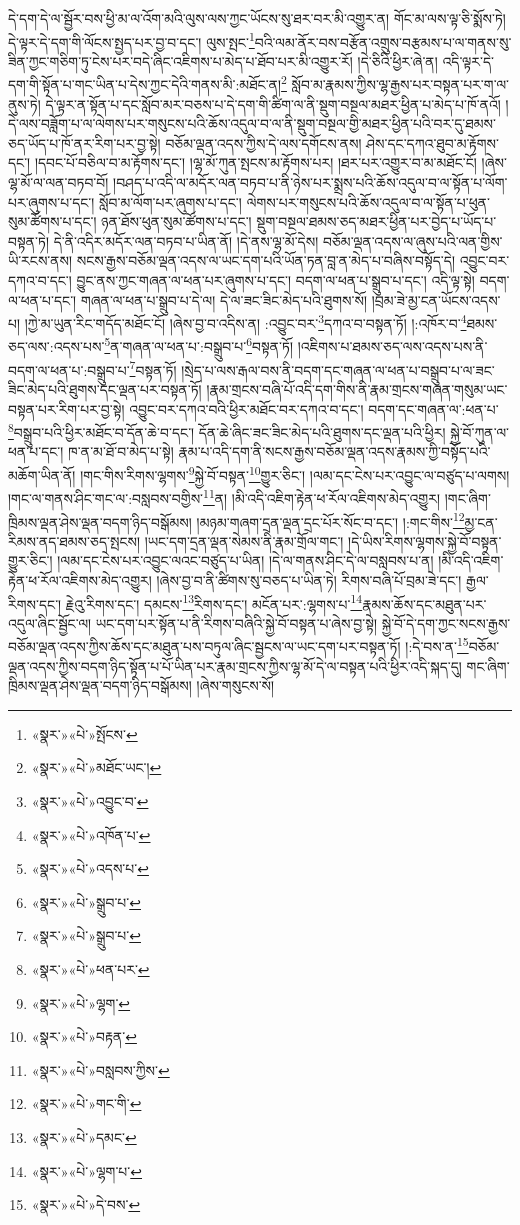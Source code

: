 དེ་དག་དེ་ལ་སྦྱོར་བས་ཕྱི་མ་ལ་འོག་མའི་ལུས་ལས་ཀྱང་ཡོངས་སུ་ཐར་བར་མི་འགྱུར་ན། གོང་མ་ལས་ལྟ་ཅི་སྨོས་ཏེ། དེ་ལྟར་དེ་དག་གི་ལོངས་སྤྱད་པར་བྱ་བ་དང་། ལུས་སྤང་\footnote{«སྣར་»«པེ་»སྤོངས་}བའི་ལམ་ནོར་བས་བརྩོན་འགྲུས་བརྩམས་པ་ལ་གནས་སུ་ཟིན་ཀྱང་གཅིག་ཏུ་ངེས་པར་བདེ་ཞིང་འཇིགས་པ་མེད་པ་ཐོབ་པར་མི་འགྱུར་རོ། །དེ་ཅིའི་ཕྱིར་ཞེ་ན། འདི་ལྟར་དེ་དག་གི་སྟོན་པ་གང་ཡིན་པ་དེས་ཀྱང་དེའི་གནས་མི་:མཐོང་ན།\footnote{«སྣར་»«པེ་»མཐོང་ཡང་།} སློབ་མ་རྣམས་ཀྱིས་ལྷ་རྒྱས་པར་བསྟན་པར་ག་ལ་ནུས་ཏེ། དེ་ལྟར་ན་སྟོན་པ་དང་སློབ་མར་བཅས་པ་དེ་དག་གི་ཚིག་ལ་ནི་སྡུག་བསྔལ་མཐར་ཕྱིན་པ་མེད་པ་ཁོ་ནའོ། །དེ་ལས་བཟློག་པ་ལ་ལེགས་པར་གསུངས་པའི་ཆོས་འདུལ་བ་ལ་ནི་སྡུག་བསྔལ་གྱི་མཐར་ཕྱིན་པའི་བར་དུ་ཐམས་ཅད་ཡོད་པ་ཁོ་ནར་རིག་པར་བྱ་སྟེ། བཅོམ་ལྡན་འདས་ཀྱིས་དེ་ལས་དགོངས་ནས། ཤེས་དང་དཀའ་ཐུབ་མ་རྟོགས་དང་། །དབང་པོ་བཅིལ་བ་མ་རྟོགས་དང་། །ལྷ་མོ་ཀུན་སྤངས་མ་རྟོགས་པར། །ཐར་པར་འགྱུར་བ་མ་མཐོང་ངོ། །ཞེས་ལྷ་མོ་ལ་ལན་བཏབ་བོ། །བཤད་པ་འདི་ལ་མདོར་ལན་བཏབ་པ་ནི་ཉེས་པར་སྨྲས་པའི་ཆོས་འདུལ་བ་ལ་སྟོན་པ་ལོག་པར་ཞུགས་པ་དང་། སློབ་མ་ལོག་པར་ཞུགས་པ་དང་། ལེགས་པར་གསུངས་པའི་ཆོས་འདུལ་བ་ལ་སྟོན་པ་ཕུན་སུམ་ཚོགས་པ་དང་། ཉན་ཐོས་ཕུན་སུམ་ཚོགས་པ་དང་། སྡུག་བསྔལ་ཐམས་ཅད་མཐར་ཕྱིན་པར་བྱེད་པ་ཡོད་པ་བསྟན་ཏེ། དེ་ནི་འདིར་མདོར་ལན་བཏབ་པ་ཡིན་ནོ། །དེ་ནས་ལྷ་མོ་དེས། བཅོམ་ལྡན་འདས་ལ་ཞུས་པའི་ལན་གྱིས་ཡི་རངས་ནས། སངས་རྒྱས་བཅོམ་ལྡན་འདས་ལ་ཡང་དག་པའི་ཡོན་ཏན་བླ་ན་མེད་པ་བཞིས་བསྟོད་དེ། འབྱུང་བར་དཀའ་བ་དང་། བྱུང་ནས་ཀྱང་གཞན་ལ་ཕན་པར་ཞུགས་པ་དང་། བདག་ལ་ཕན་པ་སྒྲུབ་པ་དང་། འདི་ལྟ་སྟེ། བདག་ལ་ཕན་པ་དང་། གཞན་ལ་ཕན་པ་སྒྲུབ་པ་དེ་ལ། དེ་ལ་ཟང་ཟིང་མེད་པའི་ཐུགས་སོ། །བྲམ་ཟེ་མྱ་ངན་ཡོངས་འདས་པ། །ཀྱེ་མ་ཡུན་རིང་གདོད་མཐོང་ངོ། །ཞེས་བྱ་བ་འདིས་ན། :འབྱུང་བར་\footnote{«སྣར་»«པེ་»འབྱུང་བ་}དཀའ་བ་བསྟན་ཏོ། །:འཁོར་བ་\footnote{«སྣར་»«པེ་»འཁོན་པ་}ཐམས་ཅད་ལས་:འདས་པས་\footnote{«སྣར་»«པེ་»འདས་པ་}ན་གཞན་ལ་ཕན་པ་:བསྒྲུབ་པ་\footnote{«སྣར་»«པེ་»སྒྲུབ་པ་}བསྟན་ཏོ། །འཇིགས་པ་ཐམས་ཅད་ལས་འདས་པས་ནི་བདག་ལ་ཕན་པ་:བསྒྲུབ་པ་\footnote{«སྣར་»«པེ་»སྒྲུབ་པ་}བསྟན་ཏོ། །སྲེད་པ་ལས་རྒལ་བས་ནི་བདག་དང་གཞན་ལ་ཕན་པ་བསྒྲུབ་པ་ལ་ཟང་ཟིང་མེད་པའི་ཐུགས་དང་ལྡན་པར་བསྟན་ཏོ། །རྣམ་གྲངས་བཞི་པོ་འདི་དག་གིས་ནི་རྣམ་གྲངས་གཞན་གསུམ་ཡང་བསྟན་པར་རིག་པར་བྱ་སྟེ། འབྱུང་བར་དཀའ་བའི་ཕྱིར་མཐོང་བར་དཀའ་བ་དང་། བདག་དང་གཞན་ལ་:ཕན་པ་\footnote{«སྣར་»«པེ་»ཕན་པར་}བསྒྲུབ་པའི་ཕྱིར་མཐོང་བ་དོན་ཆེ་བ་དང་། དོན་ཆེ་ཞིང་ཟང་ཟིང་མེད་པའི་ཐུགས་དང་ལྡན་པའི་ཕྱིར། སྐྱེ་བོ་ཀུན་ལ་ཕན་པ་དང་། ཁ་ན་མ་ཐོ་བ་མེད་པ་སྟེ། རྣམ་པ་འདི་དག་ནི་སངས་རྒྱས་བཅོམ་ལྡན་འདས་རྣམས་ཀྱི་བསྟོད་པའི་མཆོག་ཡིན་ནོ། །གང་གིས་རིགས་ལྷགས་\footnote{«སྣར་»«པེ་»ལྷག་}སྐྱེ་བོ་བསྟན་\footnote{«སྣར་»«པེ་»བརྟན་}གྱུར་ཅིང་། །ལམ་དང་ངེས་པར་འབྱུང་ལ་བཙུད་པ་ལགས། །གང་ལ་གནས་ཤིང་གང་ལ་:བསླབས་བགྱིས་\footnote{«སྣར་»«པེ་»བསླབས་ཀྱིས་}ན། །མི་འདི་འཇིག་རྟེན་ཕ་རོལ་འཇིགས་མེད་འགྱུར། །གང་ཞིག་ཁྲིམས་ལྡན་ཤེས་ལྡན་བདག་ཉིད་བསྒོམས། །མཉམ་གཞག་དྲན་ལྡན་དྲང་པོར་སོང་བ་དང་། །:གང་གིས་\footnote{«སྣར་»«པེ་»གང་གི་}མྱ་ངན་རིམས་ནད་ཐམས་ཅད་སྤངས། །ཡང་དག་དྲན་ལྡན་སེམས་ནི་རྣམ་གྲོལ་གང་། །དེ་ཡིས་རིགས་ལྷགས་སྐྱེ་བོ་བསྟན་གྱུར་ཅིང་། །ལམ་དང་ངེས་པར་འབྱུང་ལའང་བཙུད་པ་ཡིན། །དེ་ལ་གནས་ཤིང་དེ་ལ་བསླབས་པ་ན། །མི་འདི་འཇིག་རྟེན་ཕ་རོལ་འཇིགས་མེད་འགྱུར། །ཞེས་བྱ་བ་ནི་ཚིགས་སུ་བཅད་པ་ཡིན་ཏེ། རིགས་བཞི་པོ་བྲམ་ཟེ་དང་། རྒྱལ་རིགས་དང་། རྗེའུ་རིགས་དང་། དམངས་\footnote{«སྣར་»«པེ་»དམང་}རིགས་དང་། མངོན་པར་:ལྷགས་པ་\footnote{«སྣར་»«པེ་»ལྷག་པ་}རྣམས་ཆོས་དང་མཐུན་པར་འདུལ་ཞིང་སྦྱོང་ལ། ཡང་དག་པར་སྟོན་པ་ནི་རིགས་བཞིའི་སྐྱེ་བོ་བསྟན་པ་ཞེས་བྱ་སྟེ། སྐྱེ་བོ་དེ་དག་ཀྱང་སངས་རྒྱས་བཅོམ་ལྡན་འདས་ཀྱིས་ཆོས་དང་མཐུན་པས་བཏུལ་ཞིང་སྦྱངས་ལ་ཡང་དག་པར་བསྟན་ཏོ། །:དེ་བས་ན་\footnote{«སྣར་»«པེ་»དེ་བས་}བཅོམ་ལྡན་འདས་ཀྱིས་བདག་ཉིད་སྟོན་པ་པོ་ཡིན་པར་རྣམ་གྲངས་ཀྱིས་ལྷ་མོ་དེ་ལ་བསྟན་པའི་ཕྱིར་འདི་སྐད་དུ། གང་ཞིག་ཁྲིམས་ལྡན་ཤེས་ལྡན་བདག་ཉིད་བསྒོམས། །ཞེས་གསུངས་སོ། 